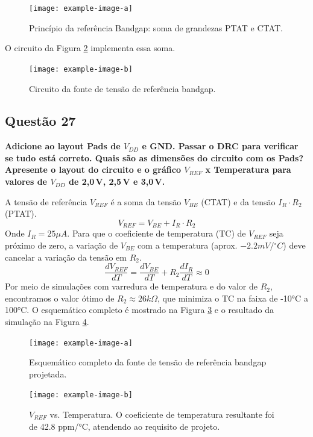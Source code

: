 \documentclass[12pt,a4paper]{article}
\newcommand{\degree}{\ensuremath{{}^\circ}}
\begin{document}
\begin{figure}[H]
\centering
\texttt{[image: example-image-a]}
\caption{Princípio da referência Bandgap: soma de grandezas PTAT e CTAT.}
\label{fig:bandgap_principle}
\end{figure}

O circuito da Figura \ref{fig:bandgap_circuit} implementa essa soma.

\begin{figure}[H]
\centering
\texttt{[image: example-image-b]}
\caption{Circuito da fonte de tensão de referência bandgap.}
\label{fig:bandgap_circuit}
\end{figure}

\subsection*{Questão 27}
	\textbf{Adicione ao layout Pads de $V_{DD}$ e GND. Passar o DRC para verificar se tudo está correto. Quais são as dimensões do circuito com os Pads? Apresente o layout do circuito e o gráfico $V_{REF}$ x Temperatura para valores de $V_{DD}$ de 2{,}0\,V, 2{,}5\,V e 3{,}0\,V.}

A tensão de referência $V_{REF}$ é a soma da tensão $V_{BE}$ (CTAT) e da tensão $I_R \cdot R_2$ (PTAT).
\begin{equation}
V_{REF} = V_{BE} + I_R \cdot R_2
\end{equation}
Onde $I_R = 25\mu A$. Para que o coeficiente de temperatura (TC) de $V_{REF}$ seja próximo de zero, a variação de $V_{BE}$ com a temperatura (aprox. $-2.2mV/\degree C$) deve cancelar a variação da tensão em $R_2$.
\begin{equation}
\frac{dV_{REF}}{dT} = \frac{dV_{BE}}{dT} + R_2 \frac{dI_R}{dT} \approx 0
\end{equation}
Por meio de simulações com varredura de temperatura e do valor de $R_2$, encontramos o valor ótimo de $R_2 \approx 26k\Omega$, que minimiza o TC na faixa de -10°C a 100°C. O esquemático completo é mostrado na Figura \ref{fig:bandgap_complete_schematic} e o resultado da simulação na Figura \ref{fig:vref_vs_temp}.

\begin{figure}[H]
\centering
\texttt{[image: example-image-a]}
\caption{Esquemático completo da fonte de tensão de referência bandgap projetada.}
\label{fig:bandgap_complete_schematic}
\end{figure}

\begin{figure}[H]
\centering
\texttt{[image: example-image-b]}
\caption{$V_{REF}$ vs. Temperatura. O coeficiente de temperatura resultante foi de 42.8 ppm/°C, atendendo ao requisito de projeto.}
\label{fig:vref_vs_temp}
\end{figure}
\end{document}
